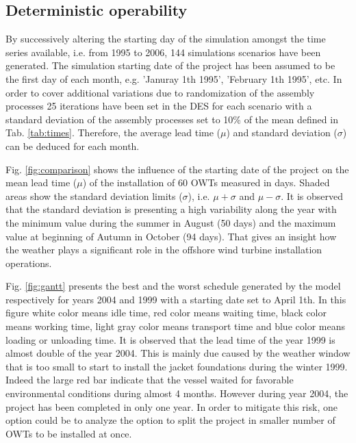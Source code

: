 \subsection{Deterministic operability}
By successively altering the starting day of the simulation amongst the time series available, i.e. from 1995 to 2006, 144 simulations scenarios have been generated. The simulation starting date of the project has been assumed to be the first day of each month, e.g. 'Januray 1th 1995', 'February 1th 1995', etc. In order to cover additional variations due to randomization of the assembly processes 25 iterations have been set in the DES for each scenario with a standard deviation of the assembly processes set to 10\% of the mean defined in Tab. \ref{tab:times}. Therefore, the average lead time ($\mu$) and standard deviation ($\sigma$) can be deduced for each month.

Fig. \ref{fig:comparison} shows the influence of the starting date of the project on the mean lead time ($\mu$) of the installation of 60 OWTs measured in days. Shaded areas show the standard deviation limits ($\sigma$), i.e. $\mu + \sigma$ and $\mu - \sigma$. It is observed that the standard deviation is presenting a high variability along the year with the minimum value during the summer in August (50 days) and the maximum value at beginning of Autumn in October (94 days). That gives an insight how the weather plays a significant role in the offshore wind turbine installation operations.

Fig. \ref{fig:gantt} presents the best and the worst schedule generated by the model respectively for years 2004 and 1999 with a starting date set to April 1th. In this figure white color means idle time, red color means waiting time, black color means working time, light gray color means transport time and blue color means loading or unloading time. It is observed that the lead time of the year 1999 is almost double of the year 2004. This is mainly due caused by the weather window that is too small to start to install the jacket foundations during the winter 1999. Indeed the large red bar indicate that the vessel waited for favorable environmental conditions during almost 4 months. However during year 2004, the project has been completed in only one year. In order to mitigate this risk, one option could be to analyze the option to split the project in smaller number of OWTs to be installed at once.
